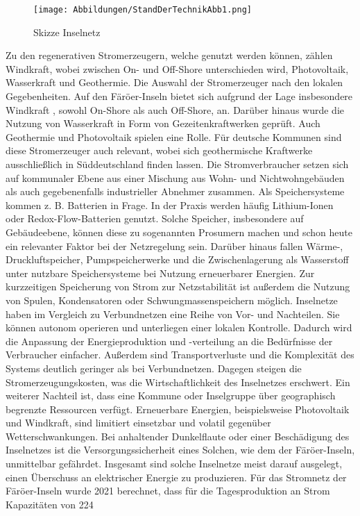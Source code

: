 \begin{figure}[h!]
    \centering
    \texttt{[image: Abbildungen/StandDerTechnikAbb1.png]}
    \caption{Skizze Inselnetz}\label{fig:Skizze_Inselnetz}
\end{figure}

Zu den regenerativen Stromerzeugern, welche genutzt werden können, zählen Windkraft, wobei zwischen On- und Off-Shore unterschieden wird, Photovoltaik, Wasserkraft und Geothermie. Die Auswahl der Stromerzeuger nach den lokalen Gegebenheiten. Auf den Färöer-Inseln bietet sich aufgrund der Lage insbesondere Windkraft , sowohl On-Shore als auch Off-Shore, an. Darüber hinaus wurde die Nutzung von Wasserkraft in Form von Gezeitenkraftwerken geprüft\cite{trondheim-thesis}. Auch Geothermie und Photovoltaik spielen eine Rolle. Für deutsche Kommunen sind diese Stromerzeuger auch relevant, wobei sich geothermische Kraftwerke ausschließlich in Süddeutschland finden lassen. Die Stromverbraucher setzen sich auf kommunaler Ebene aus einer Mischung aus Wohn- und Nichtwohngebäuden als auch gegebenenfalls industrieller Abnehmer zusammen. Als Speichersysteme kommen z. B. Batterien in Frage. In der Praxis werden häufig Lithium-Ionen oder Redox-Flow-Batterien genutzt. Solche Speicher, insbesondere auf Gebäudeebene, können diese zu sogenannten Prosumern  machen und schon heute ein relevanter Faktor bei der Netzregelung sein. Darüber hinaus fallen Wärme-, Druckluftspeicher, Pumpspeicherwerke und die Zwischenlagerung als Wasserstoff unter nutzbare Speichersysteme bei Nutzung erneuerbarer Energien. Zur kurzzeitigen Speicherung von Strom zur Netzstabilität ist außerdem die Nutzung von Spulen, Kondensatoren oder Schwungmassenspeichern möglich. 
Inselnetze haben im Vergleich zu Verbundnetzen eine Reihe von Vor- und Nachteilen. Sie können autonom operieren und unterliegen einer lokalen Kontrolle. Dadurch wird die Anpassung der Energieproduktion und -verteilung an die Bedürfnisse der Verbraucher einfacher. Außerdem sind Transportverluste und die Komplexität des Systems deutlich geringer als bei Verbundnetzen. Dagegen steigen die Stromerzeugungskosten, was die Wirtschaftlichkeit des Inselnetzes erschwert. Ein weiterer Nachteil ist, dass eine Kommune oder Inselgruppe über geographisch begrenzte Ressourcen verfügt. Erneuerbare Energien, beispielsweise Photovoltaik und Windkraft, sind limitiert einsetzbar und volatil gegenüber Wetterschwankungen. Bei anhaltender Dunkelflaute oder einer Beschädigung des Inselnetzes ist die Versorgungssicherheit eines Solchen, wie dem der Färöer-Inseln, unmittelbar gefährdet.
Insgesamt sind solche Inselnetze meist darauf ausgelegt, einen Überschuss an elektrischer Energie zu produzieren. Für das Stromnetz der Färöer-Inseln wurde 2021 berechnet, dass für die Tagesproduktion an Strom Kapazitäten von 224%
 
